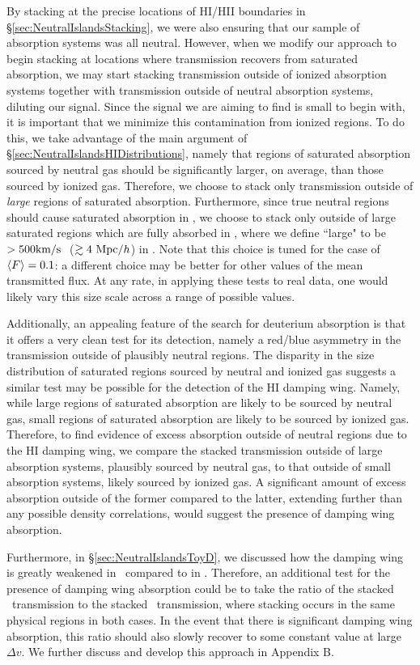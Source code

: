 By stacking at the precise locations of HI/HII boundaries in \S\ref{sec:NeutralIslandsStacking}, we were also ensuring that our sample of absorption systems was all neutral. However, when we modify our approach to begin stacking at locations where transmission recovers from saturated absorption, we may start stacking transmission outside of ionized absorption systems together with transmission outside of neutral absorption systems, diluting our signal. Since the signal we are aiming to find is small to begin with, it is important that we minimize this contamination from ionized regions. To do this, we take advantage of the main argument of \S\ref{sec:NeutralIslandsHIDistributions}, namely that regions of saturated absorption sourced by neutral gas should be significantly larger, on average, than those sourced by ionized gas. Therefore, we choose to stack only transmission outside of \textit{large} regions of saturated absorption. Furthermore, since true neutral regions should cause saturated absorption in \lyb, we choose to stack only outside of large saturated regions which are fully absorbed in \lyb, where we define ``large" to be $>500\text{km}/\text{s}\ $ ($\gtrsim 4\ \text{Mpc/$h$}$) in \lyb. Note that this choice is tuned for
the case of $\langle F \rangle = 0.1$: a different choice may be better for other values of the mean transmitted flux. At any rate, in applying these tests to real data, one would likely vary this size scale across a range
of possible values.


Additionally, an appealing feature of the search for deuterium absorption is that it offers a very clean test for its detection, namely a red/blue asymmetry in the transmission outside of plausibly neutral regions. The disparity in the size distribution of saturated regions sourced by neutral and ionized gas suggests a similar test may be possible for the detection of the HI damping wing. Namely, while large regions of saturated absorption are likely to be sourced by neutral gas, small regions of saturated absorption are likely to be sourced by ionized gas. Therefore, to find evidence of excess absorption outside of neutral regions due to the HI damping wing, we compare the stacked transmission outside of large absorption systems, plausibly sourced by neutral gas, to that outside of small absorption systems, likely sourced by ionized gas. A significant amount of excess absorption outside of the former compared to the latter, extending further than any possible density correlations, would suggest the presence of damping wing absorption.


Furthermore, in \S\ref{sec:NeutralIslandsToyD}, we discussed how the damping wing is greatly weakened in \lyb\ compared to in \lya. Therefore, an additional test for the presence of damping wing absorption could be to take the ratio of the stacked \lyb\ transmission to the stacked \lya\ transmission, where stacking occurs in the same physical regions in both cases. In the event that there is significant damping wing absorption, this ratio should also slowly recover to some constant value at large $\Delta v$. We further discuss and develop this approach in Appendix B.


